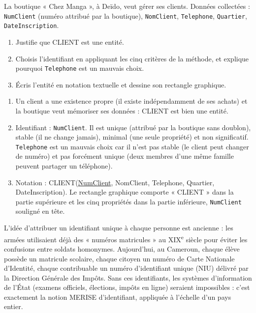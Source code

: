 \documentclass[11pt]{article}
\begin{document}
\begin{exercice}
La boutique « Chez Manga », à Deïdo, veut gérer ses clients. Données collectées : \texttt{NumClient} (numéro attribué par la boutique), \texttt{NomClient}, \texttt{Telephone}, \texttt{Quartier}, \texttt{DateInscription}.
\begin{enumerate}
\item Justifie que CLIENT est une entité.
\item Choisis l'identifiant en appliquant les cinq critères de la méthode, et explique pourquoi \texttt{Telephone} est un mauvais choix.
\item Écris l'entité en notation textuelle et dessine son rectangle graphique.
\end{enumerate}
\end{exercice}

\begin{corrige}[Exercice 1]
\begin{enumerate}
\item Un client a une existence propre (il existe indépendamment de ses achats) et la boutique veut mémoriser ses données : CLIENT est bien une entité.
\item Identifiant : \texttt{NumClient}. Il est unique (attribué par la boutique sans doublon), stable (il ne change jamais), minimal (une seule propriété) et non significatif. \texttt{Telephone} est un mauvais choix car il n'est pas stable (le client peut changer de numéro) et pas forcément unique (deux membres d'une même famille peuvent partager un téléphone).
\item Notation : CLIENT(\underline{NumClient}, NomClient, Telephone, Quartier, DateInscription). Le rectangle graphique comporte « CLIENT » dans la partie supérieure et les cinq propriétés dans la partie inférieure, \texttt{NumClient} souligné en tête.
\end{enumerate}
\end{corrige}

\begin{savaistu}
L'idée d'attribuer un identifiant unique à chaque personne est ancienne : les armées utilisaient déjà des « numéros matricules » au XIX\textsuperscript{e} siècle pour éviter les confusions entre soldats homonymes. Aujourd'hui, au Cameroun, chaque élève possède un matricule scolaire, chaque citoyen un numéro de Carte Nationale d'Identité, chaque contribuable un numéro d'identifiant unique (NIU) délivré par la Direction Générale des Impôts. Sans ces identifiants, les systèmes d'information de l'État (examens officiels, élections, impôts en ligne) seraient impossibles : c'est exactement la notion MERISE d'identifiant, appliquée à l'échelle d'un pays entier.
\end{savaistu}
\end{document}
